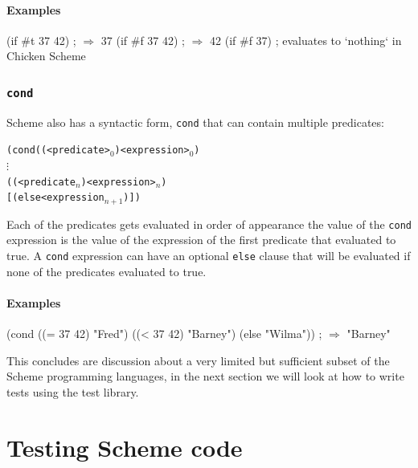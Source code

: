 \documentclass[12pt,a4paper,english,twoside]{article}
\begin{document}
\paragraph{Examples}
\begin{schemecode}
(if #t 37 42) ; $\Rightarrow$ 37
(if #f 37 42) ; $\Rightarrow$ 42
(if #f 37) ; evaluates to `nothing` in Chicken Scheme
\end{schemecode}
\subsubsection{\texttt{cond}}
Scheme also has a syntactic form, \texttt{cond} that can contain multiple 
predicates:
\begin{alltt}
  (cond ((<predicate>\(_{0}\)) <expression>\(_{0}\)) 
        \(\vdots\) 
        ((<predicate\(_{n}\)) <expression>\(_{n}\)) 
        [(else <expression\(_{n+1}\))])
\end{alltt}
Each of the predicates gets evaluated in order of appearance the value of the 
\texttt{cond} expression is the value of the expression of the first predicate 
that evaluated to true. A \texttt{cond} expression can have an optional 
\texttt{else} clause that will be evaluated if none of the predicates 
evaluated to true.
\paragraph{Examples}
\begin{schemecode}
(cond ((= 37 42) "Fred")
      ((< 37 42) "Barney")
      (else "Wilma")) ; $\Rightarrow$ "Barney"
\end{schemecode}
This concludes are discussion about a very limited but sufficient subset of 
the Scheme programming languages, in the next section we will look at how to 
write tests using the test library.
\section{Testing Scheme code}
\end{document}
